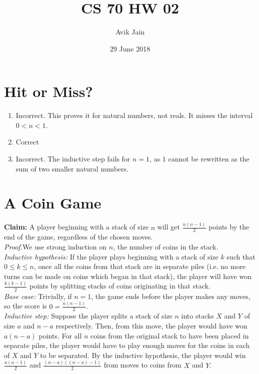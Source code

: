\documentclass{article}
\title{CS 70 HW 02}
\author{Avik Jain}
\date{29 June 2018}
\begin{document}
\maketitle

\section{Hit or Miss?}
\begin{enumerate}[label=(\alph*)]
    \item Incorrect. This proves it for natural numbers, not reals. It misses the interval $0 < n < 1$.
    \item Correct
    \item Incorrect. The inductive step fails for $n=1$, as $1$ cannot be rewritten as the sum of two smaller natural numbers.
\end{enumerate}

\section{A Coin Game}

\textbf{Claim:} A player beginning with a stack of size $n$ will get $\frac{n(n-1)}{2}$ points by the end of the game, regardless of the chosen moves. \\


\textit{Proof.}We use strong induction on $n$, the number of coins in the stack. \\

\textit{Inductive hypothesis:} If the player plays beginning with a stack of size $k$ such that $0\leq k \le n$, once all the coins from that stack are in separate piles (i.e. no more turns can be made on coins which began in that stack), the player will have won $\frac{k(k-1)}{2}$ points by splitting stacks of coins originating in that stack. \\

\textit{Base case:} Trivially, if $n=1$, the game ends before the player makes any moves, so the score is $0=\frac{n(n-1)}{2}$. \\

\textit{Inductive step:} Suppose the player splits a stack of size $n$ into stacks $X$ and $Y$ of size $a$ and $n-a$ respectively. Then, from this move, the player would have won $a(n-a)$ points. For all $n$ coins from the original stack to have been placed in separate piles, the player would have to play enough moves for the coins in each of $X$ and $Y$ to be separated. By the inductive hypothesis, the player would win $\frac{a(a-1)}{2}$ and $\frac{(n-a)((n-a)-1)}{2}$ from moves to coins from $X$ and $Y$.
\end{document}
